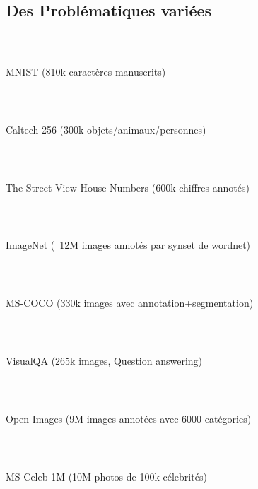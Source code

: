 \subsection{Des Problématiques variées}

\begin{frame}
  \frametitle{~}
  MNIST (810k caractères manuscrits)
\end{frame}

\begin{frame}
  \frametitle{~}
  Caltech 256 (300k objets/animaux/personnes)
\end{frame}

\begin{frame}
  \frametitle{~}
  The Street View House Numbers (600k chiffres annotés)
\end{frame}

\begin{frame}
  \frametitle{~}
  ImageNet (~12M images annotés par synset de wordnet)
\end{frame}

\begin{frame}
  \frametitle{~}
  MS-COCO (330k images avec annotation+segmentation)
\end{frame}

\begin{frame}
  \frametitle{~}
  VisualQA (265k images, Question answering)
\end{frame}

\begin{frame}
  \frametitle{~}
  Open Images (9M images annotées avec 6000 catégories)
\end{frame}

\begin{frame}
  \frametitle{~}
  MS-Celeb-1M (10M photos de 100k célebrités)
\end{frame}
